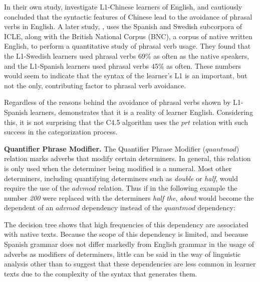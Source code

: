 \documentclass[main.tex]{subfiles}
\begin{document}
In their own study, \citeauthor{liao:2004} investigate L1-Chinese learners of English, and cautiously concluded that the syntactic features of Chinese lead to the avoidance of phrasal verbs in English. A later study, \citet{gonzalez:2010}, uses the Spanish and Swedish subcorpora of ICLE, along with the British National Corpus (BNC), a corpus of native written English, to perform a quantitative study of phrasal verb usage. They found that the L1-Swedish learners used phrasal verbs 69\% as often as the native speakers, and the L1-Spanish learners used phrasal verbs 45\% as often. These numbers would seem to indicate that the syntax of the learner's L1 is an important, but not the only, contributing factor to phrasal verb avoidance.

Regardless of the reasons behind the avoidance of phrasal verbs shown by L1-Spanish learners, \citet{gonzalez:2010} demonstrates that it is a reality of learner English. Considering this, it is not surprising that the C4.5 algorithm uses the $prt$ relation with such success in the categorization process.


\textbf{Quantifier Phrase Modifier.} The Quantifier Phrase Modifier ($quantmod$) relation marks adverbs that modify certain determiners. In general, this relation is only used when the determiner being modified is a numeral. Most other determiners, including quantifying determiners such as \textit{double} or \textit{half}, would require the use of the $advmod$ relation. Thus if in the following example \citet{typed-deps-manual} the number \textit{200} were replaced with the determiners \textit{half the}, \textit{about} would become the dependent of an $advmod$ dependency instead of the $quantmod$ dependency:

The decision tree shows that high frequencies of this dependency are associated with native texts. Because the scope of this dependency is limited, and because Spanish grammar does not differ markedly from English grammar in the usage of adverbs as modifiers of determiners, little can be said in the way of linguistic analysis other than to suggest that these dependencies are less common in learner texts due to the complexity of the syntax that generates them.
\end{document}
